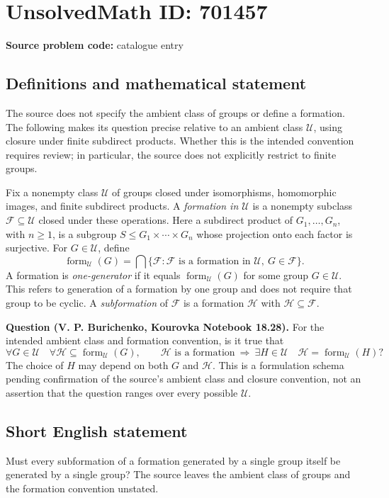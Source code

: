 \documentclass[11pt]{article}
\begin{document}
\section*{UnsolvedMath ID: 701457}
\textbf{Source problem code:} catalogue entry
\subsection{Definitions and mathematical statement}
The source does not specify the ambient class of groups or define a formation. The following makes its question precise relative to an ambient class \(\mathcal U\), using closure under finite subdirect products. Whether this is the intended convention requires review; in particular, the source does not explicitly restrict to finite groups.

Fix a nonempty class \(\mathcal U\) of groups closed under isomorphisms, homomorphic images, and finite subdirect products. A \emph{formation in \(\mathcal U\)} is a nonempty subclass \(\mathcal F\subseteq\mathcal U\) closed under these operations. Here a subdirect product of \(G_1,\ldots,G_n\), with \(n\geq 1\), is a subgroup \(S\leq G_1\times\cdots\times G_n\) whose projection onto each factor is surjective. For \(G\in\mathcal U\), define
\[
\operatorname{form}_{\mathcal U}(G)
=\bigcap\{\mathcal F:\mathcal F\text{ is a formation in }\mathcal U,\ G\in\mathcal F\}.
\]
A formation is \emph{one-generator} if it equals \(\operatorname{form}_{\mathcal U}(G)\) for some group \(G\in\mathcal U\). This refers to generation of a formation by one group and does not require that group to be cyclic. A \emph{subformation} of \(\mathcal F\) is a formation \(\mathcal H\) with \(\mathcal H\subseteq\mathcal F\).

\textbf{Question (V. P. Burichenko, Kourovka Notebook 18.28).} For the intended ambient class and formation convention, is it true that
\[
\forall G\in\mathcal U\quad
\forall\mathcal H\subseteq\operatorname{form}_{\mathcal U}(G),
\qquad
\mathcal H\text{ is a formation}
\ \Longrightarrow\ 
\exists H\in\mathcal U\quad
\mathcal H=\operatorname{form}_{\mathcal U}(H)?
\]
The choice of \(H\) may depend on both \(G\) and \(\mathcal H\). This is a formulation schema pending confirmation of the source's ambient class and closure convention, not an assertion that the question ranges over every possible \(\mathcal U\).
\subsection{Short English statement}
Must every subformation of a formation generated by a single group itself be generated by a single group? The source leaves the ambient class of groups and the formation convention unstated.
\end{document}
